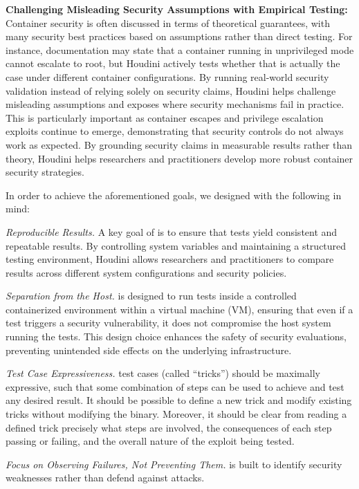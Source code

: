\textbf{Challenging Misleading Security Assumptions with Empirical Testing:}
Container security is often discussed in terms of theoretical guarantees, with many security best practices based on assumptions rather than direct testing. For instance, documentation may state that a container running in unprivileged mode cannot escalate to root, but Houdini actively tests whether that is actually the case under different container configurations. By running real-world security validation instead of relying solely on security claims, Houdini helps challenge misleading assumptions and exposes where security mechanisms fail in practice. This is particularly important as container escapes and privilege escalation exploits continue to emerge, demonstrating that security controls do not always work as expected. By grounding security claims in measurable results rather than theory, Houdini helps researchers and practitioners develop more robust container security strategies.




In order to achieve the aforementioned goals, we designed \houdini with the following in mind:
\begin{dgenum}
  \item \label{dg:repro}\textit{Reproducible Results.} A key goal of \houdini is to ensure that tests yield consistent and repeatable results. By controlling system variables and maintaining a structured testing environment, Houdini allows researchers and practitioners to compare results across different system configurations and security policies.

  \item \label{dg:container}\textit{Separation from the Host.} \houdini is designed to run tests inside a controlled containerized environment within a virtual machine (VM), ensuring that even if a test triggers a security vulnerability, it does not compromise the host system running the tests. This design choice enhances the safety of security evaluations, preventing unintended side effects on the underlying infrastructure.

  \item \label{dg:test}\textit{Test Case Expressiveness.} \houdini test cases (called \enquote{tricks}) should be maximally expressive, such that some combination of steps can be used to achieve and test any desired result. It should be possible to define a new \houdini trick and modify existing tricks without modifying the \houdini binary. Moreover, it should be clear from reading a defined trick precisely what steps are involved, the consequences of each step passing or failing, and the overall nature of the exploit being tested.

  \item \label{dg:failures}\textit{Focus on Observing Failures, Not Preventing Them.} \houdini is built to identify security weaknesses rather than defend against attacks.
\end{dgenum}

